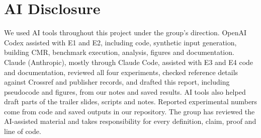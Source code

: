 \section*{AI Disclosure}

We used AI tools throughout this project under the group's direction. OpenAI Codex assisted with E1 and E2, including code, synthetic input generation, building CMR, benchmark execution, analysis, figures and documentation. Claude (Anthropic), mostly through Claude Code, assisted with E3 and E4 code and documentation, reviewed all four experiments, checked reference details against Crossref and publisher records, and drafted this report, including pseudocode and figures, from our notes and saved results. AI tools also helped draft parts of the trailer slides, scripts and notes. Reported experimental numbers come from code and saved outputs in our repository. The group has reviewed the AI-assisted material and takes responsibility for every definition, claim, proof and line of code.
